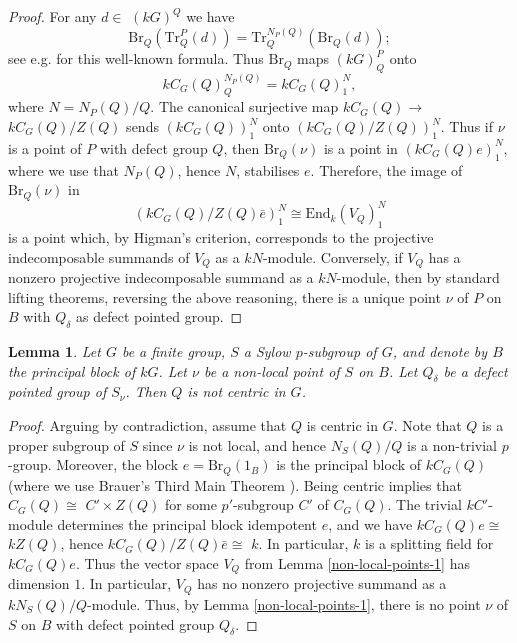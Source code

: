\documentclass{amsart}
\theoremstyle{plain}\newtheorem{Theorem}{Theorem}[section]
\theoremstyle{plain}\newtheorem{Conjecture}[Theorem]{Conjecture}
\theoremstyle{plain}\newtheorem{Corollary}[Theorem]{Corollary}
\theoremstyle{plain}\newtheorem{Lemma}[Theorem]{Lemma}
\theoremstyle{plain}\newtheorem{Proposition}[Theorem]{Proposition}
\theoremstyle{definition}\newtheorem{Definition}[Theorem]{Definition}
\theoremstyle{definition}\newtheorem{Example}[Theorem]{Example}
\theoremstyle{definition}\newtheorem{Examples}[Theorem]{Examples}
\theoremstyle{definition}\newtheorem{Exercise}[Theorem]{Exercise}
\theoremstyle{definition}\newtheorem{Notation}[Theorem]{Notation}
\theoremstyle{definition}\newtheorem{Remark}[Theorem]{Remark}
\theoremstyle{definition}\newtheorem{Remarks}[Theorem]{Remarks}
\theoremstyle{plain}\newtheorem{Statement}[Theorem]{}
\def\Br{\mathrm{Br}}                 \def\ten{\otimes}
\def\End{\mathrm{End}}
\def\Tr{\mathrm{Tr}}             \def\tenOT{\otimes_{\mathcal{O}T}}
\begin{document}
\begin{proof}
For any $d\in$ $(kG)^Q$  we have 
$$\Br_Q(\Tr^P_Q(d))= \Tr^{N_P(Q)}_Q(\Br_Q(d));$$  
see e.g. \cite[Proposition 5.4.5]{LiBookI} for this  well-known formula. 
Thus $\Br_Q$ maps $(kG)^P_Q$ onto  
$$kC_G(Q)^{N_P(Q)}_Q =  kC_G(Q)^{N}_1,$$ 
where $N=N_P(Q)/Q$. The canonical surjective map $kC_G(Q)\to$ $kC_G(Q)/Z(Q)$ 
sends  $(kC_G(Q))_1^{N}$ onto $(kC_G(Q)/Z(Q))^{N}_1$. Thus if $\nu$ is a point of 
$P$ with defect group $Q$, then  $\Br_Q(\nu)$ is a point in $(kC_G(Q)e)_1^{N}$, 
where we use that $N_P(Q)$, hence $N$,  stabilises $e$. Therefore,  the image of 
$\Br_Q(\nu)$ in 
$$(kC_G(Q)/Z(Q)\bar e)_1^{N}\cong \End_k(V_Q)_1^{N}$$ 
is a point which, by Higman's criterion,  corresponds to the projective 
indecomposable summands of $V_Q$ as a  $kN$-module.
Conversely, if $V_Q$ has a nonzero projective indecomposable summand as a 
$kN$-module, then by standard lifting theorems, reversing the above reasoning, 
there is a unique point $\nu$ of  $P$ on $B$ with $Q_\delta$ as defect pointed group.
\end{proof}

\begin{Lemma} \label{non-local-points-2}
Let $G$ be a finite group, $S$ a Sylow $p$-subgroup of $G$, and denote by
$B$ the principal block of $kG$. Let $\nu$ be a non-local point of $S$ on $B$.
Let $Q_\delta$ be a defect pointed group of $S_\nu$. Then $Q$ is not centric
in $G$.
\end{Lemma}

\begin{proof}
Arguing by contradiction, assume that $Q$ is centric in $G$. Note that
$Q$ is a proper subgroup of $S$ since $\nu$ is not local, and hence
$N_S(Q)/Q$ is a non-trivial $p$-group. Moreover, the block $e=\Br_Q(1_B)$ 
is the principal block of $kC_G(Q)$ (where we use Brauer's Third Main Theorem
\cite[Theorem 6.3.14]{LiBookII}). Being centric implies that  $C_G(Q)\cong$ 
$C'\times Z(Q)$ for some $p'$-subgroup $C'$ of $C_G(Q)$. The trivial $kC'$-module 
determines the principal block idempotent $e$, and we have $kC_G(Q)e\cong$ 
$kZ(Q)$, hence $kC_G(Q)/Z(Q)\bar e\cong$ $k$. In particular, $k$ is a splitting 
field for $kC_G(Q)e$. Thus the vector space $V_Q$ from Lemma 
\ref{non-local-points-1} has dimension $1$. In particular, $V_Q$ has no nonzero 
projective summand as a $kN_S(Q)/Q$-module. Thus, by Lemma 
\ref{non-local-points-1}, there is no point $\nu$ of $S$ on $B$ with defect 
pointed group $Q_\delta$.
\end{proof}
\end{document}
